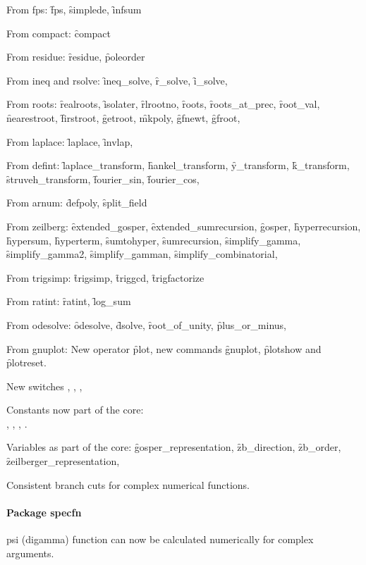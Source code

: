 From fps: \f{fps}, \f{simplede}, \f{infsum}

From compact: \f{compact}

From residue: \f{residue}, \f{poleorder}

From ineq and rsolve: \f{ineq\_solve}, \f{r\_solve}, \f{i\_solve},

From roots:
\f{realroots}, \f{isolater}, \f{rlrootno}, 
\f{roots}, \f{roots\_at\_prec}, \f{root\_val}, \f{nearestroot}, \f{firstroot},
\f{getroot}, \f{mkpoly}, \f{gfnewt}, \f{gfroot},

From laplace: \f{laplace}, \f{invlap},

From defint:
\f{laplace\_transform}, \f{hankel\_transform}, \f{y\_transform}, \f{k\_transform}, \f{struveh\_transform},
\f{fourier\_sin}, \f{fourier\_cos},

From arnum: \f{defpoly}, \f{split\_field}

From zeilberg:
\f{extended\_gosper}, \f{extended\_sumrecursion},
\f{gosper}, \f{hyperrecursion}, \f{hypersum}, \f{hyperterm},
\f{sumtohyper}, \f{sumrecursion},
\f{simplify\_gamma}, \f{simplify\_gamma2}, \f{simplify\_gamman}, \f{simplify\_combinatorial},

From trigsimp: \f{trigsimp}, \f{triggcd}, \f{trigfactorize}

From ratint: \f{ratint}, \f{log\_sum}

From odesolve:
\f{odesolve}, \f{dsolve}, \f{root\_of\_unity}, \f{plus\_or\_minus},

From gnuplot:
New operator \f{plot}, new commands \f{gnuplot}, \f{plotshow} and \f{plotreset}.

New switches , , , 

Constants now part of the core:\\
, , ,
.

Variables as part of the core: \f{gosper\_representation},
\f{zb\_direction}, \f{zb\_order}, \f{zeilberger\_representation},


Consistent branch cuts for complex numerical functions.



\paragraph{Package specfn}

psi (digamma) function can now be calculated numerically for complex arguments.

